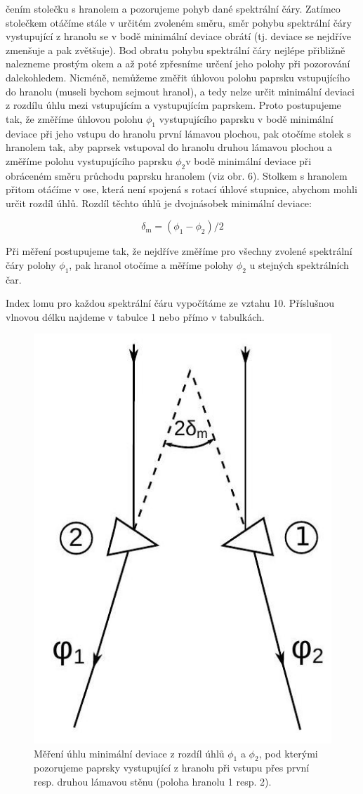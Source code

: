\documentclass[czech,11pt,a4paper]{article}
\begin{document}
\begin{multicols}{2}
čením stolečku s hranolem a pozorujeme pohyb dané spektrální čáry. Zatímco stolečkem otáčíme stále v určitém zvoleném směru, směr pohybu spektrální čáry vystupující z hranolu se v bodě minimální deviace obrátí (tj. deviace se nejdříve zmenšuje a pak zvětšuje). Bod obratu pohybu spektrální čáry nejlépe přibližně nalezneme prostým okem a až poté zpřesníme určení jeho polohy při pozorování dalekohledem. Nicméně, nemůžeme změřit úhlovou polohu paprsku vstupujícího do hranolu (museli bychom sejmout hranol), a tedy nelze určit minimální deviaci z rozdílu úhlu mezi vstupujícím a vystupujícím paprskem. Proto postupujeme tak, že změříme úhlovou polohu $\phi_{1}$ vystupujícího paprsku v bodě minimální deviace při jeho vstupu do hranolu první lámavou plochou, pak otočíme stolek s hranolem tak, aby paprsek vstupoval do hranolu druhou lámavou plochou a změříme polohu vystupujícího paprsku $\phi_{2} \mathrm{v}$ bodě minimální deviace při obráceném směru průchodu paprsku hranolem (viz obr. 6). Stolkem s hranolem přitom otáćíme v ose, která není spojená s rotací úhlové stupnice, abychom mohli určit rozdíl úhlů. Rozdíl těchto úhlů je dvojnásobek minimální deviace:

\begin{equation}
	\delta_{\mathrm{m}}=\left(\phi_{1}-\phi_{2}\right) / 2
\end{equation}


Při měření postupujeme tak, že nejdříve změříme pro všechny zvolené spektrální čáry polohy $\phi_{1}$, pak hranol otočíme a měříme polohy $\phi_{2}$ u stejných spektrálních čar.

Index lomu pro každou spektrální čáru vypočítáme ze vztahu 10. Příslušnou vlnovou délku najdeme v tabulce 1 nebo přímo v tabulkách.\\
\begin{figure}
	\includegraphics[max width=0.45\linewidth, center]{2024_12_03_db7ee7d12aab7219c185g-6}
	\caption{Měření úhlu minimální deviace z rozdíl úhlů $\phi_{1}$ a $\phi_{2}$, pod kterými pozorujeme paprsky vystupující z hranolu při vstupu přes první resp. druhou lámavou stěnu (poloha hranolu 1 resp. 2).}
\end{figure}



\end{multicols}
\end{document}
